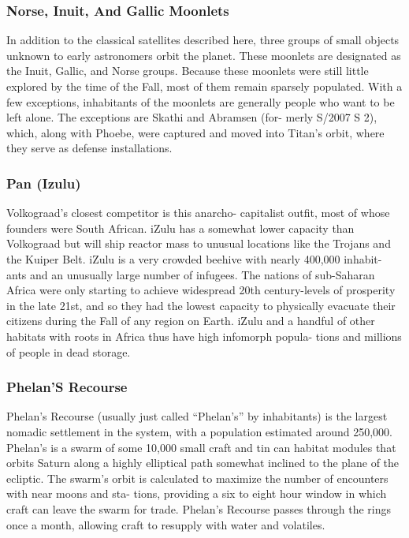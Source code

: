 \subsubsection{Norse, Inuit, And Gallic Moonlets}

In addition to the classical satellites described here, 
three groups of small objects unknown to early 
astronomers orbit the planet. These moonlets are 
designated as the Inuit, Gallic, and Norse groups. 
Because these moonlets were still little explored by 
the time of the Fall, most of them remain sparsely 
populated. With a few exceptions, inhabitants of the 
moonlets are generally people who want to be left 
alone. The exceptions are Skathi and Abramsen (for-
merly S/2007 S 2), which, along with Phoebe, were 
captured and moved into Titan's orbit, where they 
serve as defense installations.

\subsubsection{Pan (Izulu)}

Volkograad's closest competitor is this anarcho-
capitalist outfit, most of whose founders were South 
African. iZulu has a somewhat lower capacity than 
Volkograad but will ship reactor mass to unusual 
locations like the Trojans and the Kuiper Belt. iZulu is 
a very crowded beehive with nearly 400,000 inhabit-
ants and an unusually large number of infugees. The 
nations of sub-Saharan Africa were only starting to 
achieve widespread 20th century-levels of prosperity 
in the late 21st, and so they had the lowest capacity to 
physically evacuate their citizens during the Fall of any 
region on Earth. iZulu and a handful of other habitats 
with roots in Africa thus have high infomorph popula-
tions and millions of people in dead storage.

\subsubsection{Phelan'S Recourse}

Phelan's Recourse (usually just called ``Phelan's'' by 
inhabitants) is the largest nomadic settlement in the 
system, with a population estimated around 250,000. 
Phelan's is a swarm of some 10,000 small craft and tin 
can habitat modules that orbits Saturn along a highly 
elliptical path somewhat inclined to the plane of the 
ecliptic. The swarm's orbit is calculated to maximize 
the number of encounters with near moons and sta-
tions, providing a six to eight hour window in which 
craft can leave the swarm for trade. Phelan's Recourse 
passes through the rings once a month, allowing craft 
to resupply with water and volatiles.

